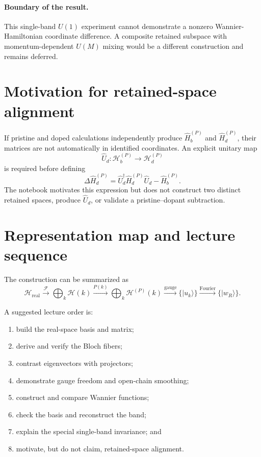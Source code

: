 \documentclass[11pt]{article}
\newcommand{\Hilbert}{\mathcal H}
\newcommand{\ket}[1]{\lvert #1\rangle}
\begin{document}
\paragraph{Boundary of the result.}
This single-band $U(1)$ experiment cannot demonstrate a nonzero
Wannier-Hamiltonian coordinate difference. A composite retained subspace with
momentum-dependent $U(M)$ mixing would be a different construction and remains
deferred.

\section{Motivation for retained-space alignment}

If pristine and doped calculations independently produce
$\hat H_b^{(P)}$ and $\hat H_d^{(P)}$, their matrices are not automatically in
identified coordinates. An explicit unitary map
\begin{equation}
 \hat U_d:\Hilbert_b^{(P)}\longrightarrow\Hilbert_d^{(P)}
\end{equation}
is required before defining
\begin{equation}
 \Delta\hat H_d^{(P)}
 =\hat U_d^\dagger\hat H_d^{(P)}\hat U_d-\hat H_b^{(P)}.
\end{equation}
The notebook motivates this expression but does not construct two distinct
retained spaces, produce $\hat U_d$, or validate a pristine--dopant subtraction.

\section{Representation map and lecture sequence}

The construction can be summarized as
\begin{equation}
\Hilbert_{\mathrm{real}}
\xrightarrow{\mathcal F}
\bigoplus_k\Hilbert(k)
\xrightarrow{P(k)}
\bigoplus_k\Hilbert^{(P)}(k)
\xrightarrow{\mathrm{gauge}}
\{\ket{u_k}\}
\xrightarrow{\mathrm{Fourier}}
\{\ket{w_R}\}.
\end{equation}

A suggested lecture order is:
\begin{enumerate}
 \item build the real-space basis and matrix;
 \item derive and verify the Bloch fibers;
 \item contrast eigenvectors with projectors;
 \item demonstrate gauge freedom and open-chain smoothing;
 \item construct and compare Wannier functions;
 \item check the basis and reconstruct the band;
 \item explain the special single-band invariance; and
 \item motivate, but do not claim, retained-space alignment.
\end{enumerate}
\end{document}
